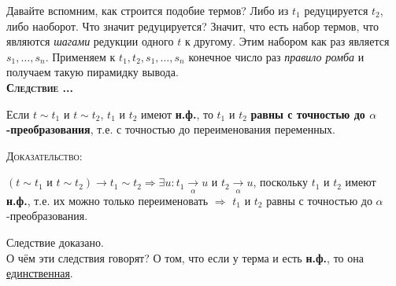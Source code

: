\documentclass[18pt, a4paper]{extarticle}
\newcounter{par}
\newcounter{spar}
\newcounter{zap}
\newcommand{\sled}{\textbf{\textsc{Следствие \thepar.\if\thespar1\thespar.\fi\thezap.\;}}\stepcounter{zap}}
\newcommand{\dok}{\textsc{Доказательство:}}
\newcommand{\lot}[3]{#1_#2,\dots,#1_#3}
\newcommand{\reda}{\underset{\alpha}{\longrightarrow}}
\begin{document}
\begin{center}
\end{center}\leavevmode
Давайте вспомним, как строится подобие термов? Либо из $t_1$ редуцируется $t_2$, либо наоборот. Что значит редуцируется? Значит, что есть набор термов, что являются \textit{шагами} редукции одного $t$ к другому. Этим набором как раз является $\lot s 1 n$. Применяем к $t_1,t_2,\lot s 1 n$ конечное число раз \textit{правило ромба} и получаем такую пирамидку вывода.\\

\sled 

Если $t\sim t_1$ и $t\sim t_2$, $t_1$ и $t_2$ имеют \textbf{н.ф.}, то $t_1$ и $t_2$ \textbf{равны с точностью до $\alpha$-преобразования}, т.е. с точностью до переименования переменных.

\dok 

$(t\sim t_1\text{ и }t\sim t_2)\to t_1\sim t_2\Rightarrow\exists u\!\!:t_1\reda u\text{ и }t_2\reda u$, поскольку $t_1$ и $t_2$ имеют \textbf{н.ф.}, т.е. их можно только переименовать $\Rightarrow$ $t_1$ и $t_2$ равны с точностью до $\alpha$-преобразования.

Следствие доказано.\\

О чём эти следствия говорят? О том, что если у терма и есть \textbf{н.ф.}, то она \underline{единственная}.
\end{document}
